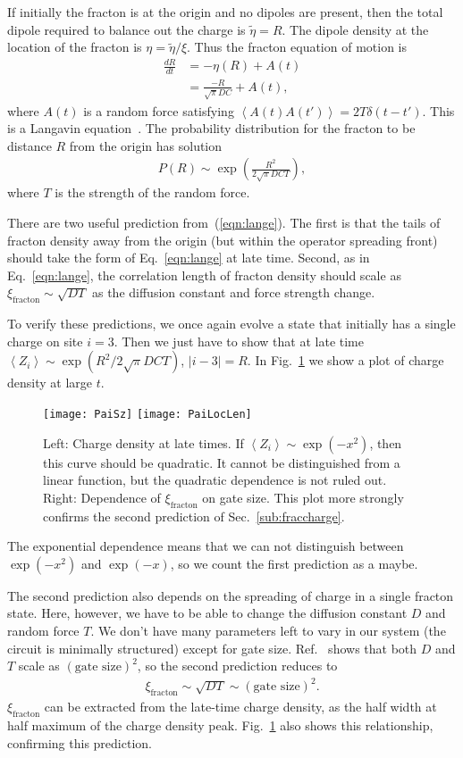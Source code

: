 \documentclass[a4paper,11pt]{article}
\newcommand{\nd}[2]{\frac{d #1}{d #2}}
\newcommand{\ex}[1]{\left\langle #1 \right\rangle}
\begin{document}
If initially the fracton is at the origin and no dipoles are present, then the total dipole required to balance out the charge is $\tilde{\eta}=R$. The dipole density at the location of the fracton is $\eta = \tilde{\eta}/\xi$. Thus the fracton equation of motion is
\begin{align}
\nd{R}{t} &= -\eta(R) + A(t)\\
&= \frac{-R}{\sqrt{\pi} DC}+ A(t),
\end{align}
where $A(t)$ is a random force satisfying $\ex{A(t)A(t')} = 2T\delta(t-t')$.  This is a Langavin equation~\cite{MarenduAsp}. The probability distribution for the fracton to be distance $R$ from the origin has solution
\begin{align}
P(R) \sim \exp\left(\frac{R^2}{2\sqrt{\pi}DCT}\right), \label{eqn:lange}
\end{align}
where $T$ is the strength of the random force. 

There are two useful prediction from~(\ref{eqn:lange}). The first is that the tails of fracton density away from the origin (but within the operator spreading front) should take the form of Eq.~\ref{eqn:lange} at late time. Second, as in Eq.~\ref{eqn:lange}, the correlation length of fracton density should scale as $\xi_\text{fracton}\sim \sqrt{DT}$ as the diffusion constant and force strength change. 

To verify these predictions, we once again evolve a state that initially has a single charge on site $i=3$. Then we just have to show that at late time $\ex{Z_i}\sim\exp(R^2/2\sqrt{\pi}DCT)$, $|i-3|=R$. 
In Fig.~\ref{fig:PaiSz} we show a plot of charge density at large $t$. 
\begin{figure}
	\centering
	\texttt{[image: PaiSz]}
	\texttt{[image: PaiLocLen]}
	\caption{Left: Charge density at late times. If $\ex{Z_i}\sim\exp(-x^2)$, then this curve should be quadratic. It cannot be distinguished from a linear function, but the quadratic dependence is not ruled out. Right: Dependence of $\xi_\text{fracton}$ on gate size. This plot more strongly confirms the second prediction of Sec.~\ref{sub:fraccharge}.}
	\label{fig:PaiSz}
\end{figure}
The exponential dependence means that we can not distinguish between $\exp(-x^2)$ and $\exp(-x)$, so we count the first prediction as a maybe. 

The second prediction also depends on the spreading of charge in a single fracton state. Here, however, we have to be able to change the diffusion constant $D$ and random force $T$. We don't have many parameters left to vary in our system (the circuit is minimally structured) except for gate size. Ref.~\cite{PaiFracton} shows that both $D$ and $T$ scale as $(\text{gate size})^2$, so the second prediction reduces to
\begin{align}
\xi_\text{fracton}\sim\sqrt{DT}\sim(\text{gate size})^2.
\end{align}
$\xi_\text{fracton}$ can be extracted from the late-time charge density, as the half width at half maximum of the charge density peak.
Fig.~\ref{fig:PaiSz} also shows this relationship, confirming this prediction.
\end{document}
